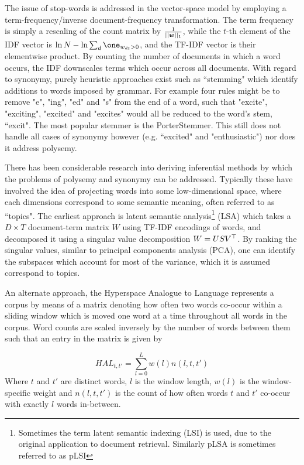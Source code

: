 The issue of stop-words is addressed in the vector-space model by employing a term-frequency/inverse document-frequency transformation. The term frequency is simply a rescaling of the count matrix by $\frac{1}{||\bm w||_1}$, while the $t$-th element of the IDF vector is $\ln N - \ln \sum_d \one_{w_{dt} > 0}$, and the TF-IDF vector is their elementwise product. By counting the number of documents in which a word occurs, the IDF downscales terms which occur across all documents. With regard to synonymy, purely heuristic approaches exist such as ``stemming" which identify additions to words imposed by grammar. For example four rules might be to remove "e", "ing", "ed" and "s" from the end of a word, such that "excite", "exciting", "excited" and "excites" would all be reduced to the word's stem, ``excit". The most popular stemmer is the PorterStemmer. This still does not handle all cases of synonymy however (e.g. ``excited" and "enthusiastic") nor does it address polysemy.

There has been considerable research into deriving inferential methods by which the problems of polysemy and synonymy can be addressed. Typically these have involved the idea of projecting words into some low-dimensional space, where each dimensions correspond to some semantic meaning, often referred to as ``topics". The earliest approach is latent semantic analysis\footnote{Sometimes the term latent semantic indexing (LSI) is used, due to the original application to document retrieval. Similarly pLSA is sometimes referred to as pLSI} (LSA)\cite{Deerwester1990} which takes a $D\times T$ document-term matrix $W$ using TF-IDF encodings of words, and decomposed it using a singular value decomposition $W = USV^\top$. By ranking the singular values, similar to principal components analysis (PCA), one can identify the subspaces which account for most of the variance, which it is assumed correspond to topics.

An alternate approach, the Hyperspace Analogue to Language\cite{Lund1996} represents a corpus by means of a matrix denoting how often two words co-occur within a sliding window which is moved one word at a time throughout all words in the corpus. Word counts are scaled inversely by the number of words between them such that an entry in the matrix is given by 

\begin{equation*}
HAL_{t,t'} = \sum_{l=0}^L w(l) n(l, t, t')
\end{equation*}
Where $t$ and $t'$ are distinct words, $l$ is the window length, $w(l)$ is the window-specific weight and $n(l, t, t')$ is the count of how often words $t$ and $t'$ co-occur with exactly $l$ words in-between.

